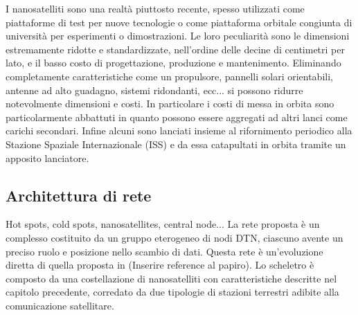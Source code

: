\documentclass[a4paper]{article}
\begin{document}
			I nanosatelliti sono una realtà piuttosto recente, spesso utilizzati come piattaforme di test per nuove tecnologie o come piattaforma orbitale congiunta di università per esperimenti o dimostrazioni. Le loro peculiarità sono le dimensioni estremamente ridotte e standardizzate, nell'ordine delle decine di centimetri per lato, e il basso costo di progettazione, produzione e mantenimento. Eliminando completamente caratteristiche come un propulsore, pannelli solari orientabili, antenne ad alto guadagno, sistemi ridondanti, ecc... si possono ridurre notevolmente dimensioni e costi. In particolare i costi di messa in orbita sono particolarmente abbattuti in quanto possono essere aggregati ad altri lanci come carichi secondari. Infine alcuni sono lanciati insieme al rifornimento periodico alla Stazione Spaziale Internazionale (ISS) e da essa catapultati in orbita tramite un apposito lanciatore. 
			
			
			
		
		
		\subsection{Architettura di rete}	
		{\sc Hot spots, cold spots, nanosatellites, central node...}
		La rete proposta è un complesso costituito da un gruppo eterogeneo di nodi DTN, ciascuno avente un preciso ruolo e posizione nello scambio di dati. Questa rete è un'evoluzione diretta di quella proposta in (Inserire reference al papiro). Lo scheletro è composto da una costellazione di nanosatelliti con caratteristiche descritte nel capitolo precedente, corredato da due tipologie di stazioni terrestri adibite alla comunicazione satellitare. 
		
\end{document}
